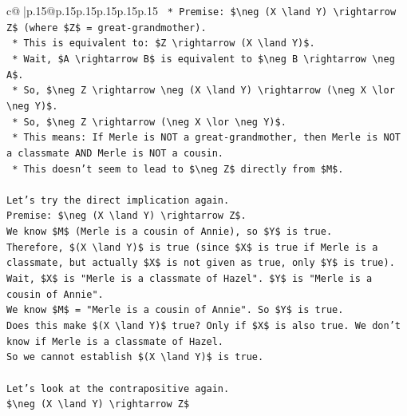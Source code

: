 \documentclass{article}
\begin{document}
{\begin{supertabular}{c@{$\;$}|p{.15\linewidth}@{}p{.15\linewidth}p{.15\linewidth}p{.15\linewidth}p{.15\linewidth}p{.15\linewidth}}
{{{\texttt{    *   Premise: \$\textbackslash{}neg (X \textbackslash{}land Y) \textbackslash{}rightarrow Z\$ (where \$Z\$ = great{-}grandmother).} \\
\texttt{    *   This is equivalent to: \$Z \textbackslash{}rightarrow (X \textbackslash{}land Y)\$.} \\
\texttt{    *   Wait, \$A \textbackslash{}rightarrow B\$ is equivalent to \$\textbackslash{}neg B \textbackslash{}rightarrow \textbackslash{}neg A\$.} \\
\texttt{    *   So, \$\textbackslash{}neg Z \textbackslash{}rightarrow \textbackslash{}neg (X \textbackslash{}land Y) \textbackslash{}rightarrow (\textbackslash{}neg X \textbackslash{}lor \textbackslash{}neg Y)\$.} \\
\texttt{    *   So, \$\textbackslash{}neg Z \textbackslash{}rightarrow (\textbackslash{}neg X \textbackslash{}lor \textbackslash{}neg Y)\$.} \\
\texttt{    *   This means: If Merle is NOT a great{-}grandmother, then Merle is NOT a classmate AND Merle is NOT a cousin.} \\
\texttt{    *   This doesn't seem to lead to \$\textbackslash{}neg Z\$ directly from \$M\$.} \\
\\ 
\texttt{Let's try the direct implication again.} \\
\texttt{Premise: \$\textbackslash{}neg (X \textbackslash{}land Y) \textbackslash{}rightarrow Z\$.} \\
\texttt{We know \$M\$ (Merle is a cousin of Annie), so \$Y\$ is true.} \\
\texttt{Therefore, \$(X \textbackslash{}land Y)\$ is true (since \$X\$ is true if Merle is a classmate, but actually \$X\$ is not given as true, only \$Y\$ is true).} \\
\texttt{Wait, \$X\$ is "Merle is a classmate of Hazel". \$Y\$ is "Merle is a cousin of Annie".} \\
\texttt{We know \$M\$ = "Merle is a cousin of Annie". So \$Y\$ is true.} \\
\texttt{Does this make \$(X \textbackslash{}land Y)\$ true? Only if \$X\$ is also true. We don't know if Merle is a classmate of Hazel.} \\
\texttt{So we cannot establish \$(X \textbackslash{}land Y)\$ is true.} \\
\\ 
\texttt{Let's look at the contrapositive again.} \\
\texttt{\$\textbackslash{}neg (X \textbackslash{}land Y) \textbackslash{}rightarrow Z\$} \\
}}}
\end{supertabular}}
\end{document}
